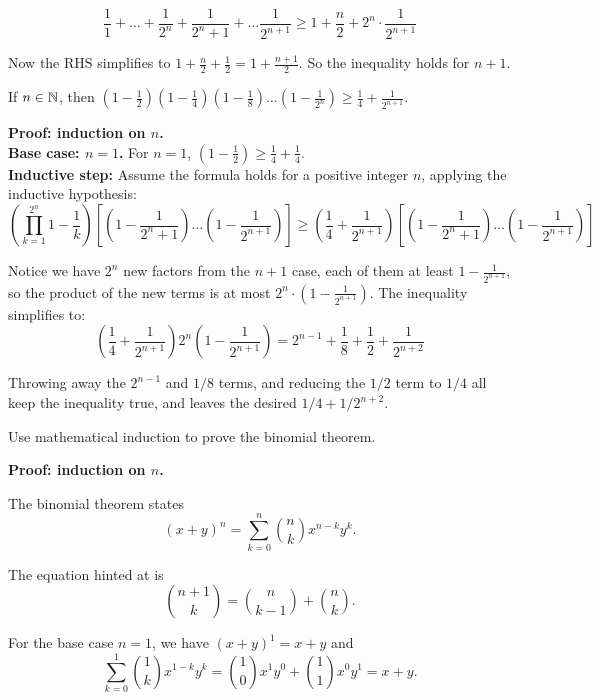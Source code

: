 \documentclass{article}
\begin{document}
$$\frac{1}{1} + \ldots + \frac{1}{2^n} + \frac{1}{2^n + 1} + \ldots \frac{1}{2^{n+1}} \geq 1 + \frac{n}{2} + 2^n \cdot \frac{1}{2^{n+1}}$$

Now the RHS simplifies to $1 + \frac{n}{2} + \frac{1}{2} = 1 + \frac{n+1}{2}$. So the inequality holds for $n+1$.

\begin{problem}
If $n \in \mathbb{N}$, then $\left(1 - \frac{1}{2}\right)\left(1 - \frac{1}{4}\right)\left(1 - \frac{1}{8}\right)\ldots\left(1 - \frac{1}{2^n}\right) \geq \frac{1}{4} + \frac{1}{2^{n+1}}$.
\end{problem}

\textbf{Proof: induction on $n$.}
\\

\textbf{Base case: $n = 1$.} For $n = 1$, $\left(1 - \frac{1}{2}\right) \geq \frac{1}{4} + \frac{1}{4}$.
\\

\textbf{Inductive step:} Assume the formula holds for a positive integer $n$, applying the inductive hypothesis:
$$\left(\prod_{k=1}^{2^n}1-\frac{1}{k}\right)\left[\left(1 - \frac{1}{2^{n} + 1}\right) \ldots \left(1 - \frac{1}{2^{n+1}}\right)\right] \geq \left(\frac{1}{4} + \frac{1}{2^{n+1}}\right)\left[\left(1 - \frac{1}{2^{n} + 1}\right) \ldots \left(1 - \frac{1}{2^{n+1}}\right)\right] $$

Notice we have $2^n$ new factors from the $n+1$ case, each of them at least $1 - \frac{1}{2^{n+1}}$, so the product of the new terms is at most $2^n \cdot \left(1 - \frac{1}{2^{n+1}}\right)$. The inequality simplifies to:
$$\left(\frac{1}{4} + \frac{1}{2^{n+1}}\right)2^n\left(1 - \frac{1}{2^{n+1}}\right) = 2^{n-1} + \frac{1}{8} + \frac{1}{2} + \frac{1}{2^{n+2}}$$

Throwing away the $2^{n-1}$ and $1/8$ terms, and reducing the $1/2$ term to $1/4$ all keep the inequality true, and leaves the desired $1/4 + 1/2^{n+2}$.

\begin{problem}
Use mathematical induction to prove the binomial theorem.
\end{problem}

\textbf{Proof: induction on $n$.}

The binomial theorem states
$$(x + y)^n = \sum_{k=0}^{n} \binom{n}{k}x^{n-k}y^k.$$

The equation hinted at is
$$\binom{n+1}{k} = \binom{n}{k-1} + \binom{n}{k}.$$

For the base case $n = 1$, we have $(x + y)^1 = x + y$ and
$$\sum_{k=0}^1 \binom{1}{k} x^{1-k}y^k = \binom{1}{0}x^1 y^0 + \binom{1}{1}x^0 y^1 = x + y.$$
\end{document}
